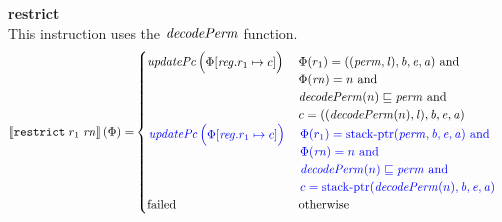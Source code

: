 \documentclass[a4paper]{article}
\begin{document}
\noindent\textbf{restrict}\\
This instruction uses the $\decPerm{}$ function.
\begin{align*}
  \sem{\trestrict{r_1}{\rn}}(\Phi) = &
                                      \begin{cases}
                                        \updPcAddr{}\left(
                                          \arraycolsep=0pt
                                          \begin{array}{rl}
                                          \Phi &\updReg{r_1}{c}
                                          \end{array} \right)
&
                                        \arraycolsep=0pt
                                        \begin{array}[t]{l}
                                          \Phi(r_1) = ((\perm,\lin),\baddr,\eaddr,\aaddr) \tand \\
                                          \Phi(\rn) = n \tand\\
                                          \decPerm{n} \sqsubseteq \perm \tand \\
                                          c = ((\decPerm{n},\lin),\baddr,\eaddr,\aaddr)
                                        \end{array}
                                        \\
                                        \sourcecolor\left.
                                        \updPcAddr{}\left(
                                          \arraycolsep=0pt
                                          \begin{array}{rl}
                                          \Phi &\updReg{r_1}{c}
                                          \end{array}\right)\right.
                                        &
                                        \sourcecolor\left.
                                        \arraycolsep=0pt
                                        \begin{array}[t]{l}
                                          \Phi(r_1) = \stkptr{\perm,\baddr,\eaddr,\aaddr} \tand \\
                                          \Phi(\rn) = n \tand\\
                                          \decPerm{n} \sqsubseteq \perm \tand \\
                                          c = \stkptr{\decPerm{n},\baddr,\eaddr,\aaddr}
                                        \end{array}\right.
                                        \\
                                        \failed & \totherwise
                                      \end{cases}
\end{align*}
\end{document}
